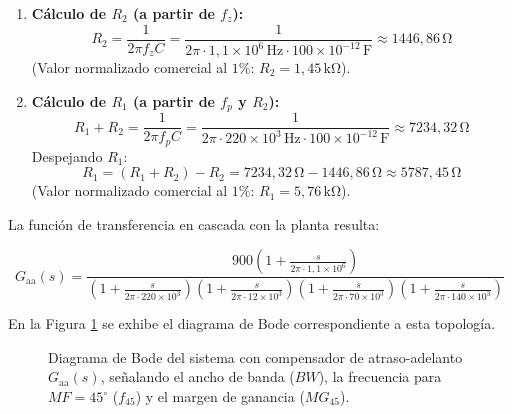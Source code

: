 \begin{enumerate}
    \item \textbf{Cálculo de $R_2$ (a partir de $f_z$):}
    \begin{equation}
        R_2 = \frac{1}{2\pi f_z C} = \frac{1}{2\pi \cdot 1,1 \times 10^6\,\si{\hertz} \cdot 100 \times 10^{-12}\,\si{\farad}} \approx 1446,86\,\si{\ohm}
        \label{eq.ej2:calculo_R2}
    \end{equation}
    (Valor normalizado comercial al $1\%$: $R_2 = 1,45\,\si{\kilo\ohm}$).

    \item \textbf{Cálculo de $R_1$ (a partir de $f_p$ y $R_2$):}
    \begin{equation}
        R_1 + R_2 = \frac{1}{2\pi f_p C} = \frac{1}{2\pi \cdot 220 \times 10^3\,\si{\hertz} \cdot 100 \times 10^{-12}\,\si{\farad}} \approx 7234,32\,\si{\ohm}
    \end{equation}
    Despejando $R_1$:
    \begin{equation}
        R_1 = (R_1 + R_2) - R_2 = 7234,32\,\si{\ohm} - 1446,86\,\si{\ohm} \approx 5787,45\,\si{\ohm}
        \label{eq.ej2:calculo_R1}
    \end{equation}
    (Valor normalizado comercial al $1\%$: $R_1 = 5,76\,\si{\kilo\ohm}$).
\end{enumerate}


La función de transferencia en cascada con la planta resulta:

\begin{equation}
    G_{\text{aa}}(s) = \frac{900 \left(1 + \frac{s}{2\pi \cdot 1,1 \times 10^6}\right)}{\left(1 + \frac{s}{2\pi \cdot 220 \times 10^3}\right) \left(1 + \frac{s}{2\pi \cdot 12 \times 10^3}\right) \left(1 + \frac{s}{2\pi \cdot 70 \times 10^3}\right) \left(1 + \frac{s}{2\pi \cdot 140 \times 10^3}\right)}
    \label{eq.ej2:fdt_sistema_aa}
\end{equation}

En la Figura \ref{fig.ej2:bode_aa} se exhibe el diagrama de Bode correspondiente a esta topología.

\begin{figure}[!ht]
    \centering
    
    \caption{Diagrama de Bode del sistema con compensador de atraso-adelanto $G_{\text{aa}}(s)$, señalando el ancho de banda ($BW$), la frecuencia para $MF = 45^\circ$ ($f_{45}$) y el margen de ganancia ($MG_{45}$).}
    \label{fig.ej2:bode_aa}
\end{figure}

